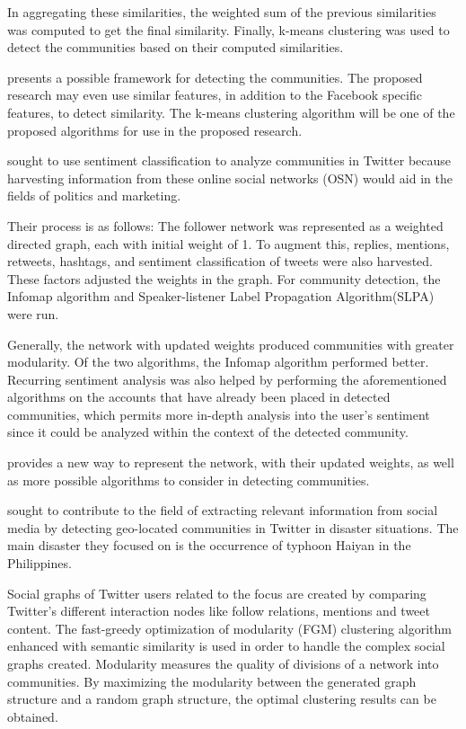 In aggregating these similarities, the weighted sum of the previous similarities was computed to get the final similarity. Finally, k-means clustering was used to detect the communities based on their computed similarities. 

 presents a possible framework for detecting the communities. The proposed research may even use similar features, in addition to the Facebook specific features, to detect similarity. The k-means clustering algorithm will be one of the proposed algorithms for use in the proposed research.

 sought to use sentiment classification to analyze communities in Twitter because harvesting information from these online social networks (OSN) would aid in the fields of politics and marketing. 

Their process is as follows: The follower network was represented as a weighted directed graph, each with initial weight of 1. To augment this, replies, mentions, retweets, hashtags, and sentiment classification of tweets were also harvested. These factors adjusted the weights in the graph. For community detection, the Infomap algorithm and Speaker-listener Label Propagation Algorithm(SLPA) were run. 

Generally, the network with updated weights produced communities with greater modularity. Of the two algorithms, the Infomap algorithm performed better. Recurring sentiment analysis was also helped by performing the aforementioned algorithms on the accounts that have already been placed in detected communities, which permits more in-depth analysis into the user’s sentiment since it could be analyzed within the context of the detected community.

 provides a new way to represent the network, with their updated weights, as well as more possible algorithms to consider in detecting communities.

 sought to contribute to the field of extracting relevant information from social media by detecting geo-located communities in Twitter in disaster situations. The main disaster they focused on is the occurrence of typhoon Haiyan in the Philippines. 

Social graphs of Twitter users related to the focus are created by comparing Twitter's different interaction nodes like follow relations, mentions and tweet content. The fast-greedy optimization of modularity (FGM) clustering algorithm enhanced with semantic similarity is used in order to handle the complex social graphs created. Modularity measures the quality of divisions of a network into communities. By maximizing the modularity between the generated graph structure and a random graph structure, the optimal clustering results can be obtained. 

